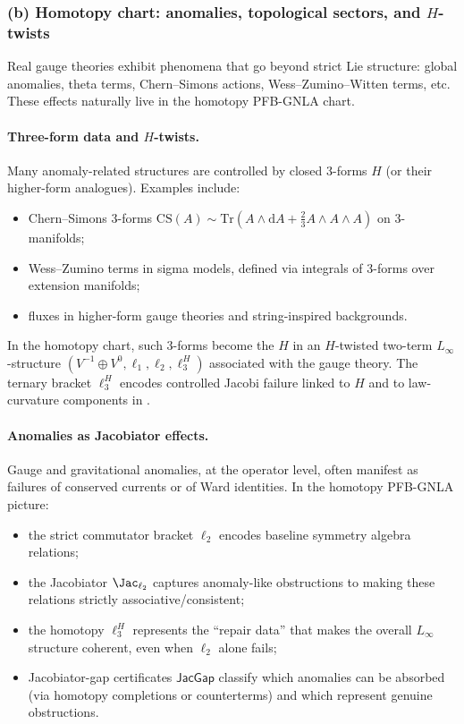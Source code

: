 \documentclass[11pt]{book}
\theoremstyle{plain}
\theoremstyle{definition}
\begin{document}
\subsubsection*{(b) Homotopy chart: anomalies, topological sectors, and $H$-twists}

Real gauge theories exhibit phenomena that go beyond strict Lie
structure: global anomalies, theta terms, Chern--Simons actions,
Wess--Zumino--Witten terms, etc. These effects naturally live in the
homotopy PFB-GNLA chart.

\paragraph{Three-form data and $H$-twists.}

Many anomaly-related structures are controlled by closed 3-forms $H$
(or their higher-form analogues). Examples include:

\begin{itemize}
  \item Chern--Simons 3-forms
        $\mathrm{CS}(A)\sim \mathrm{Tr}(A\wedge\mathrm{d}A
          +\tfrac23 A\wedge A\wedge A)$ on 3-manifolds;
  \item Wess--Zumino terms in sigma models, defined via integrals of
        3-forms over extension manifolds;
  \item fluxes in higher-form gauge theories and string-inspired
        backgrounds.
\end{itemize}

In the homotopy chart, such 3-forms become the $H$ in an
$H$-twisted two-term $L_\infty$-structure
$(V^{-1}\oplus V^0,\ell_1,\ell_2,\ell_3^H)$ associated with the gauge
theory. The ternary bracket $\ell_3^H$ encodes controlled Jacobi
failure linked to $H$ and to law-curvature components in \GZLCurv.

\paragraph{Anomalies as Jacobiator effects.}

Gauge and gravitational anomalies, at the operator level, often manifest
as failures of conserved currents or of Ward identities. In the
homotopy PFB-GNLA picture:

\begin{itemize}
  \item the strict commutator bracket $\ell_2$ encodes baseline symmetry
        algebra relations;
  \item the Jacobiator $\Jac_{\ell_2}$ captures anomaly-like obstructions
        to making these relations strictly associative/consistent;
  \item the homotopy $\ell_3^H$ represents the “repair data” that makes
        the overall $L_\infty$ structure coherent, even when $\ell_2$
        alone fails;
  \item Jacobiator-gap certificates $\mathsf{JacGap}$ classify which
        anomalies can be absorbed (via homotopy completions or
        counterterms) and which represent genuine obstructions.
\end{itemize}
\end{document}
